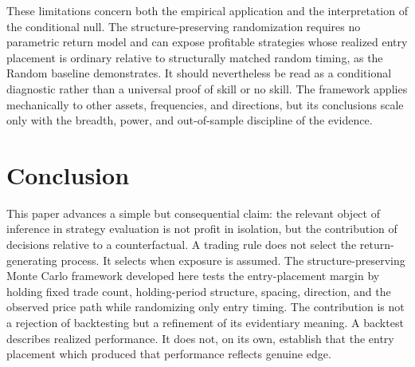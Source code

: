 \documentclass[preprint,12pt]{elsarticle}
\theoremstyle{definition}
\begin{document}
These limitations concern both the empirical application and the interpretation of the conditional null. The structure-preserving randomization requires no parametric return model and can expose profitable strategies whose realized entry placement is ordinary relative to structurally matched random timing, as the Random baseline demonstrates. It should nevertheless be read as a conditional diagnostic rather than a universal proof of skill or no skill. The framework applies mechanically to other assets, frequencies, and directions, but its conclusions scale only with the breadth, power, and out-of-sample discipline of the evidence.

\section{Conclusion}

This paper advances a simple but consequential claim: the relevant object of inference in strategy evaluation is not profit in isolation, but the contribution of decisions relative to a counterfactual. A trading rule does not select the return-generating process. It selects when exposure is assumed. The structure-preserving Monte Carlo framework developed here tests the entry-placement margin by holding fixed trade count, holding-period structure, spacing, direction, and the observed price path while randomizing only entry timing. The contribution is not a rejection of backtesting but a refinement of its evidentiary meaning. A backtest describes realized performance. It does not, on its own, establish that the entry placement which produced that performance reflects genuine edge.
\end{document}
